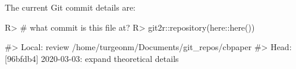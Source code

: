 \documentclass[
]{jss}
\begin{document}
The current Git commit details are:

\begin{CodeChunk}

\begin{CodeInput}
R> # what commit is this file at? 
R> git2r::repository(here::here())
\end{CodeInput}

\begin{CodeOutput}
#> Local:    review /home/turgeonm/Documents/git_repos/cbpaper
#> Head:     [96bfdb4] 2020-03-03: expand theoretical details
\end{CodeOutput}
\end{CodeChunk}


\end{document}
